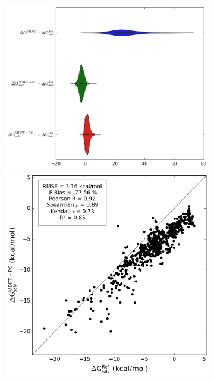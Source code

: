 \begin{figure}[ht]
   \begin{subfigure}[b]{0.40\textwidth}
         \includegraphics[width=\textwidth]{chapters/BDD/images/freesolv_1/error_distribution_calc_all.png}
         \par\bigskip
         \includegraphics[width=\textwidth]{chapters/BDD/images/freesolv_1/correlation__mdft_energy_pc__vs__calc.png}

\end{subfigure}
\end{figure}
